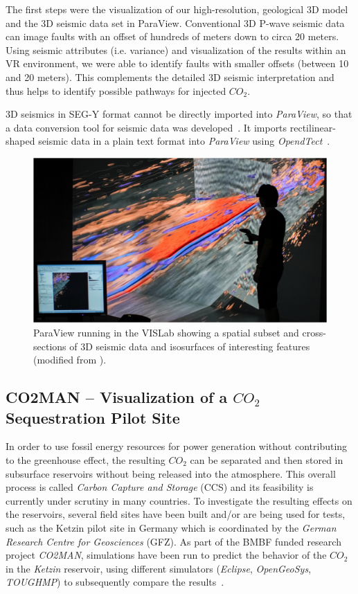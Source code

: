 \documentclass[twocolumn]{svjour3}          %
\begin{document}
The first steps were the visualization of our high-resolution, geological 3D model and the 3D seismic data set in ParaView. Conventional 3D P-wave seismic data can image faults with an offset of hundreds of meters down to circa 20 meters. Using seismic attributes (i.e. variance) and visualization of the results within an VR environment, we were able to identify faults with smaller offsets (between 10 and 20 meters). This complements the detailed 3D seismic interpretation and thus helps to identify possible pathways for injected $CO_{2}$.

3D seismics in SEG-Y format cannot be directly imported into \emph{ParaView}, so that a data conversion tool for seismic data was developed~\cite{bilke:simpleseismicreader}. It imports rectilinear-shaped seismic data in a plain text format into \emph{ParaView} using \emph{OpendTect}~\cite{web:opendtect}.

\begin{figure}[htb]
  \includegraphics[width=\linewidth]{images/seismic.jpg}
\caption{ParaView running in the VISLab showing a spatial subset and cross-sections of 3D seismic data and isosurfaces of interesting features (modified from \cite{krawczyk:deformation}).}
\label{fig:seismic}
\end{figure}


\subsection{CO2MAN -- Visualization of a  $CO_{2}$ Sequestration Pilot Site}
\label{co2man}

In order to use fossil energy resources for power generation without contributing to the greenhouse effect, the resulting $CO_{2}$ can be separated and then stored in subsurface reservoirs without being released into the atmosphere. This overall process is called \emph{Carbon Capture and Storage} (CCS) and its feasibility is currently under scrutiny in many countries. To investigate the resulting effects on the reservoirs, several field sites have been built and/or are being used for tests, such as the Ketzin pilot site in Germany which is coordinated by the \emph{German Research Centre for Geosciences} (GFZ). As part of the BMBF funded research project \emph{CO2MAN}, simulations have been run to predict the behavior of the $CO_{2}$ in the \emph{Ketzin} reservoir, using different simulators (\emph{Eclipse}, \emph{OpenGeoSys}, \emph{TOUGHMP}) to subsequently compare the results~\cite{Kempka2013418}.
\end{document}
